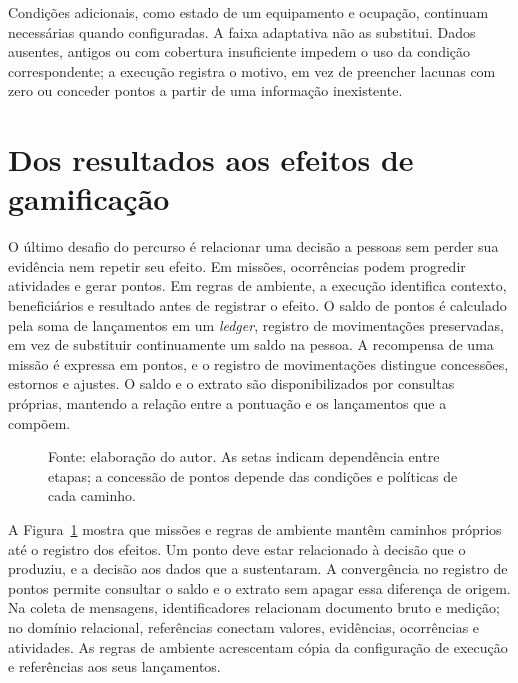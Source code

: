 \documentclass[tcc,capa]{texufpel}
\begin{document}
Condições adicionais, como estado de um equipamento e ocupação, continuam necessárias quando configuradas. A faixa adaptativa não as substitui. Dados ausentes, antigos ou com cobertura insuficiente impedem o uso da condição correspondente; a execução registra o motivo, em vez de preencher lacunas com zero ou conceder pontos a partir de uma informação inexistente.

\section{Dos resultados aos efeitos de gamificação}
O último desafio do percurso é relacionar uma decisão a pessoas sem perder sua evidência nem repetir seu efeito. Em missões, ocorrências podem progredir atividades e gerar pontos. Em regras de ambiente, a execução identifica contexto, beneficiários e resultado antes de registrar o efeito. O saldo de pontos é calculado pela soma de lançamentos em um \emph{ledger}, registro de movimentações preservadas, em vez de substituir continuamente um saldo na pessoa. A recompensa de uma missão é expressa em pontos, e o registro de movimentações distingue concessões, estornos e ajustes. O saldo e o extrato são disponibilizados por consultas próprias, mantendo a relação entre a pontuação e os lançamentos que a compõem.

\begin{figure}[!htb]\centering
\caption{Caminhos distintos entre evidências, participação e efeitos de gamificação.}
\label{fig:rastreabilidade}
\par\vspace{5mm}

\par\vspace{3mm}
\caption*{Fonte: elaboração do autor. As setas indicam dependência entre etapas; a concessão de pontos depende das condições e políticas de cada caminho.}
\end{figure}

A Figura~\ref{fig:rastreabilidade} mostra que missões e regras de ambiente mantêm caminhos próprios até o registro dos efeitos. Um ponto deve estar relacionado à decisão que o produziu, e a decisão aos dados que a sustentaram. A convergência no registro de pontos permite consultar o saldo e o extrato sem apagar essa diferença de origem. Na coleta de mensagens, identificadores relacionam documento bruto e medição; no domínio relacional, referências conectam valores, evidências, ocorrências e atividades. As regras de ambiente acrescentam cópia da configuração de execução e referências aos seus lançamentos.
\end{document}
